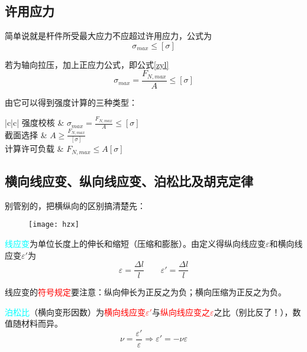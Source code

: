 \documentclass[10pt,a4paper]{ctexart}
\begin{document}
\subsection{许用应力}
简单说就是杆件所受最大应力不应超过许用应力，公式为
\begin{equation}
	\sigma_{max}\leqslant\left[\sigma\right]%
\end{equation}
\par 若为轴向拉压，加上正应力公式，即公式\ref{zyl}%
\begin{equation}
	\sigma_{max}=\frac{F_{N,max}}{A}\leqslant\left[\sigma\right]
\end{equation}
\par
由它可以得到强度计算的三种类型：

\begin{table}[h]
	\centering
	\begin{tblr}{|c|c|}%
		\hline
		强度校核 & $\sigma_{max}=\frac{F_{N,max}}{A}\leqslant\left[\sigma\right]$ \\
		\hline
		截面选择 & $A\geqslant\frac{F_{N,max}}{\left[\sigma\right]}$\\
		\hline
		计算许可负载 & $F_{N,max}\leqslant A\left[\sigma\right]$\\
		\hline
	\end{tblr}
\end{table}


\subsection{横向线应变、纵向线应变、泊松比及胡克定律}
别管别的，把横纵向的区别搞清楚先：
\begin{figure}[htp]%
	\centering
	\texttt{[image: hzx]}
\end{figure}

\textcolor{cyan}{线应变}为单位长度上的伸长和缩短（压缩和膨胀）。由定义得纵向线应变$\varepsilon$和横向线应变$\varepsilon'$为
\begin{equation}
\varepsilon=\frac{\Delta l}{l} \qquad%
  \varepsilon'=\frac{\Delta l}{l}
  \label{dy}
\end{equation}

线应变的\textcolor{red}{符号规定}要注意：纵向伸长为正反之为负；横向压缩为正反之为负。

\textcolor{cyan}{泊松比}（横向变形因数）为\textcolor{red}{横向线应变$\varepsilon'$}与\textcolor{red}{纵向线应变之$\varepsilon$}之比（别比反了！），数值随材料而异。
\begin{equation}
 \nu=\frac{\varepsilon'}{\varepsilon} \Rightarrow \varepsilon'=-\nu \varepsilon
 \label{psb}
\end{equation}
\end{document}
